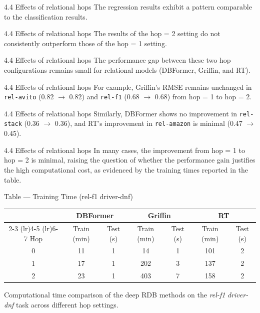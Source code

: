 \documentclass[aspectratio=169,10pt]{beamer}
\begin{document}
\begin{frame}{4.4 Effects of relational hops}
The regression results exhibit a pattern comparable to the classification results.
\end{frame}

\begin{frame}{4.4 Effects of relational hops}
The results of the hop = 2 setting do not consistently outperform those of the hop = 1 setting.
\end{frame}

\begin{frame}{4.4 Effects of relational hops}
The performance gap between these two hop configurations remains small for relational models (DBFormer, Griffin, and RT).
\end{frame}

\begin{frame}{4.4 Effects of relational hops}
For example, Griffin's RMSE remains unchanged in \texttt{rel-avito} (0.82 $\rightarrow$ 0.82) and \texttt{rel-f1} (0.68 $\rightarrow$ 0.68) from hop = 1 to hop = 2.
\end{frame}

\begin{frame}{4.4 Effects of relational hops}
Similarly, DBFormer shows no improvement in \texttt{rel-stack} (0.36 $\rightarrow$ 0.36), and RT's improvement in \texttt{rel-amazon} is minimal (0.47 $\rightarrow$ 0.45).
\end{frame}

\begin{frame}{4.4 Effects of relational hops}
In many cases, the improvement from hop = 1 to hop = 2 is minimal, raising the question of whether the performance gain justifies the high computational cost, as evidenced by the training times reported in the table.
\end{frame}

\begin{frame}{Table --- Training Time (rel-f1 driver-dnf)}
\centering
\begin{tabular}{ccccccc}
\toprule
& \multicolumn{2}{c}{DBFormer} & \multicolumn{2}{c}{Griffin} & \multicolumn{2}{c}{RT} \\
\cmidrule(lr){2-3} \cmidrule(lr){4-5} \cmidrule(lr){6-7}
Hop & Train (min) & Test (s) & Train (min) & Test (s) & Train (min) & Test (s) \\
\midrule
0 & 11 & 1 & 14 & 1 & 101 & 2 \\
1 & 17 & 1 & 202 & 3 & 137 & 2 \\
2 & 23 & 1 & 403 & 7 & 158 & 2 \\
\bottomrule
\end{tabular}

\footnotesize
Computational time comparison of the deep RDB methods on the \emph{rel-f1} \emph{driver-dnf} task across different hop settings.
\end{frame}
\end{document}
